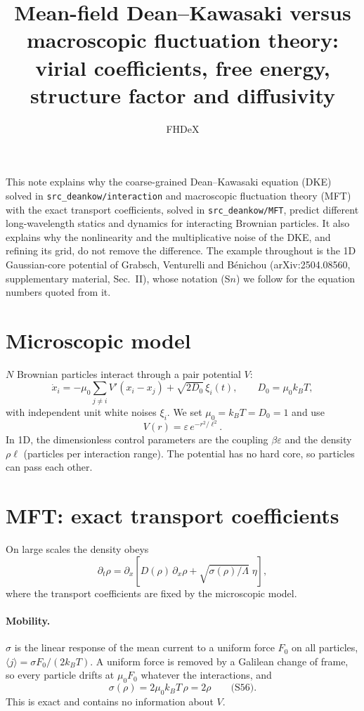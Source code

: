 \documentclass[11pt]{article}
\title{Mean-field Dean--Kawasaki versus macroscopic fluctuation theory:\\
virial coefficients, free energy, structure factor and diffusivity}
\author{FHDeX}
\date{}
\newcommand{\code}[1]{\texttt{#1}}
\begin{document}
\maketitle

\noindent This note explains why the coarse-grained Dean--Kawasaki equation
(DKE) solved in \code{src\_deankow/interaction} and macroscopic fluctuation
theory (MFT) with the exact transport coefficients, solved in
\code{src\_deankow/MFT}, predict different long-wavelength statics and
dynamics for interacting Brownian particles. It also explains why the
nonlinearity and the multiplicative noise of the DKE, and refining its grid,
do not remove the difference. The example throughout is the 1D Gaussian-core
potential of Grabsch, Venturelli and B\'enichou (arXiv:2504.08560,
supplementary material, Sec.~II), whose notation (S$n$) we follow for the
equation numbers quoted from it.

\section{Microscopic model}

$N$ Brownian particles interact through a pair potential $V$:
\begin{equation}\label{eq:langevin}
  \dot x_i = -\mu_0 \sum_{j\neq i} V'(x_i-x_j) + \sqrt{2D_0}\,\xi_i(t),
  \qquad D_0=\mu_0 k_BT,
\end{equation}
with independent unit white noises $\xi_i$. We set $\mu_0=k_BT=D_0=1$ and use
\begin{equation}
  V(r) = \varepsilon\, e^{-r^2/\ell^2}.
\end{equation}
In 1D, the dimensionless control parameters are the coupling $\beta\varepsilon$
and the density $\rho\ell$ (particles per interaction range). The potential has
no hard core, so particles can pass each other.

\section{MFT: exact transport coefficients}

On large scales the density obeys
\begin{equation}\label{eq:mft}
  \partial_t\rho = \partial_x\!\left[D(\rho)\,\partial_x\rho
     + \sqrt{\sigma(\rho)/\Lambda}\;\eta\right],
\end{equation}
where the transport coefficients are fixed by the microscopic model.

\paragraph{Mobility.} $\sigma$ is the linear response of the mean current to a
uniform force $F_0$ on all particles, $\langle j\rangle = \sigma F_0/(2k_BT)$.
A uniform force is removed by a Galilean change of frame, so every particle
drifts at $\mu_0F_0$ whatever the interactions, and
\begin{equation}\label{eq:sigma}
  \sigma(\rho) = 2\mu_0 k_BT\,\rho = 2\rho \qquad\text{(S56)}.
\end{equation}
This is exact and contains no information about $V$.
\end{document}
